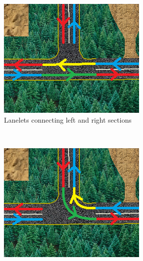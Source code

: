 \begin{figure}
    \centering
    \begin{subfigure}[b]{0.3\textwidth}
        \includegraphics[width=\textwidth]{intersection_paths_group_1}
        \caption{Lanelets connecting left and right sections}
        \label{fig:intersection_paths_group_1}
    \end{subfigure}
    ~ %
    \begin{subfigure}[b]{0.3\textwidth}
        \includegraphics[width=\textwidth]{intersection_paths_group_2}

\end{subfigure}
\end{figure}
